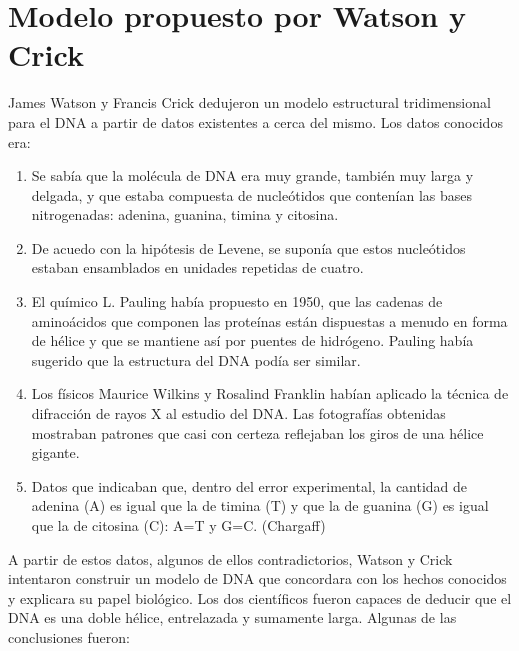 \chapter{Modelo propuesto por Watson y Crick}
\label{modelo}

James Watson y Francis Crick dedujeron un modelo estructural tridimensional para el DNA a partir de datos existentes a cerca del mismo. 
Los datos conocidos era:
\begin{enumerate}
	\item Se sabía que la molécula de DNA era muy grande, también muy larga y delgada, y que estaba compuesta de nucleótidos que contenían las bases 				nitrogenadas: adenina, guanina, timina y citosina.
	\item De acuedo con la hipótesis de Levene, se suponía que estos nucleótidos estaban ensamblados en unidades repetidas de cuatro.
	\item El químico L. Pauling había propuesto en 1950, que las cadenas de aminoácidos que componen las proteínas están dispuestas a menudo en forma
			de hélice y que se mantiene así por puentes de hidrógeno. Pauling había sugerido que la estructura del DNA podía ser similar.
	\item Los físicos Maurice Wilkins y Rosalind Franklin habían aplicado la técnica de difracción de rayos X al estudio del DNA. Las fotografías 				obtenidas mostraban patrones que casi con certeza reflejaban los giros de una hélice gigante.
	\item  Datos que indicaban que, dentro del error experimental, la cantidad de adenina (A) es igual que la de timina (T) y que la de guanina (G) es 				igual que la de citosina (C): A=T y G=C. (Chargaff)
\end{enumerate}
A partir de estos datos, algunos de ellos contradictorios, Watson y Crick intentaron construir un modelo de DNA que concordara con los hechos conocidos y explicara su papel biológico. Los dos científicos fueron capaces de deducir que el DNA es una doble hélice, entrelazada y sumamente larga.
Algunas de las conclusiones fueron:
